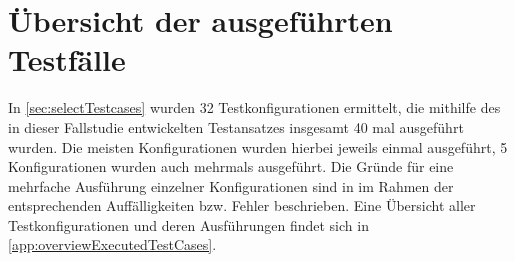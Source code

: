 \section{Übersicht der ausgeführten Testfälle}
\label{sec:overviewExecTestCases}

In \autoref{sec:selectTestcases} wurden 32 Testkonfigurationen ermittelt, die mithilfe des in dieser Fallstudie entwickelten Testansatzes insgesamt 40 mal ausgeführt wurden.
Die meisten Konfigurationen wurden hierbei jeweils einmal ausgeführt, 5 Konfigurationen wurden auch mehrmals ausgeführt.
Die Gründe für eine mehrfache Ausführung einzelner Konfigurationen sind in im Rahmen der entsprechenden Auffälligkeiten bzw. Fehler beschrieben.
Eine Übersicht aller Testkonfigurationen und deren Ausführungen findet sich in \autoref{app:overviewExecutedTestCases}.


